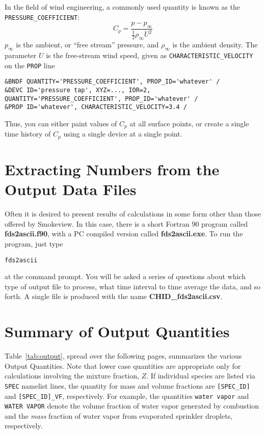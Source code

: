 \documentclass[11pt]{book}
\newcommand{\ct}{\tt\small}
\newcommand{\ha}{\frac{1}{2}}
\newcommand{\be}{\begin{equation}}
\newcommand{\ee}{\end{equation}}
\begin{document}
In the field of wind engineering, a commonly used quantity is known as the {\ct PRESSURE\_COEFFICIENT}:
\be
   C_p = \frac{p-p_\infty}{\ha \rho_\infty U^2}
\ee
$p_\infty$ is the ambient, or ``free stream'' pressure, and $\rho_\infty$ is the ambient density.
The parameter $U$ is the free-stream wind speed, given as {\ct CHARACTERISTIC\_VELOCITY} on the {\ct PROP} line

\footnotesize
\begin{verbatim}
&BNDF QUANTITY='PRESSURE_COEFFICIENT', PROP_ID='whatever' /
&DEVC ID='pressure tap', XYZ=..., IOR=2, QUANTITY='PRESSURE_COEFFICIENT', PROP_ID='whatever' /
&PROP ID='whatever', CHARACTERISTIC_VELOCITY=3.4 /
\end{verbatim}
\normalsize

\noindent
Thus, you can either paint values of $C_p$ at all surface points, or create a single time history of $C_p$ using a single device at a single point.







\section{Extracting Numbers from the Output Data Files}
\label{info:fds2ascii} 

Often it is desired to present results of calculations in some form other
than those offered by Smokeview. In this case, there is a short
Fortran 90 program called {\bf fds2ascii.f90}, with a PC compiled version
called {\bf fds2ascii.exe}. To run the program, just type
\begin{verbatim}
fds2ascii
\end{verbatim}
at the command prompt. You will be asked a series of questions
about which type of output file to process, what time interval to
time average the data, and so forth. A single file is produced
with the name {\bf CHID\_fds2ascii.csv}.


\clearpage
\section{Summary of Output Quantities}
\label{info:outputquantities} 

Table~\ref{tab:output}, spread over the following pages, summarizes the various Output Quantities.
Note that lower case quantities are appropriate only for calculations involving the mixture fraction, $Z$. If
individual species are listed via {\ct SPEC} namelist lines, the quantity for mass and volume
fractions are {\ct [SPEC\_ID]} and {\ct [SPEC\_ID]\_VF}, respectively. For example, the quantities
{\ct water vapor} and {\ct WATER VAPOR} denote the volume fraction of water vapor
generated by combustion and the {\em mass} fraction of water vapor from evaporated sprinkler
droplets, respectively.
\end{document}
